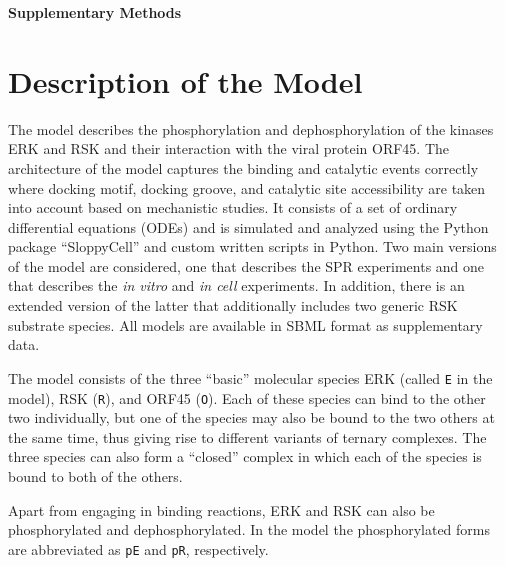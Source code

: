 \documentclass[12pt]{article}
\begin{document}
	
	{\noindent\Large \textbf{Supplementary Methods}}
	
	\section{Description of the Model}
	The model describes the phosphorylation and dephosphorylation of the kinases ERK and RSK and their interaction with the viral protein ORF45. The architecture of the model captures the binding and catalytic events correctly where docking motif, docking groove, and catalytic site accessibility are taken into account based on mechanistic studies. It consists of a set of ordinary differential equations (ODEs) and is simulated and analyzed using the Python package ``SloppyCell'' and custom written scripts in Python. Two main versions of the model are considered, one that describes the SPR experiments and one that describes the \textit{in vitro} and \textit{in cell} experiments. In addition, there is an extended version of the latter that additionally includes two generic RSK substrate species. All models are available in SBML format as supplementary data.
	
	The model consists of the three ``basic'' molecular species ERK
	(called \texttt{E} in the model), RSK (\texttt{R}), and ORF45 (\texttt{O}).
	Each of these species can bind to the other two individually, but
	one of the species may also be bound to the two others at the same
	time, thus giving rise to different variants of ternary complexes.
	The three species can also form a ``closed'' complex in
	which each of the species is bound to both of the others.
	
	Apart from engaging in binding reactions, ERK and RSK can also be
	phosphorylated and dephosphorylated. In the model the phosphorylated
	forms are abbreviated as \texttt{pE} and \texttt{pR}, respectively.
	
\end{document}
